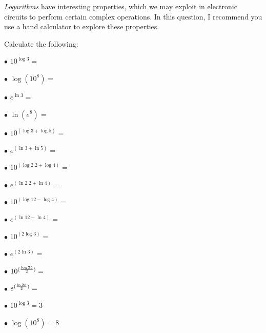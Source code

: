 

{\it Logarithms} have interesting properties, which we may exploit in electronic circuits to perform certain complex operations.  In this question, I recommend you use a hand calculator to explore these properties.

Calculate the following:

\medskip
\item{$\bullet$} $10^{\log 3} =$ 
\item{$\bullet$} $\log (10^8) =$

\vskip 10pt

\item{$\bullet$} $e^{\ln 3} =$ 
\item{$\bullet$} $\ln (e^8) =$

\vskip 10pt

\item{$\bullet$} $10^{(\log 3 + \log 5)} =$
\item{$\bullet$} $e^{(\ln 3 + \ln 5)} =$

\vskip 10pt

\item{$\bullet$} $10^{(\log 2.2 + \log 4)} =$
\item{$\bullet$} $e^{(\ln 2.2 + \ln 4)} =$

\vskip 10pt

\item{$\bullet$} $10^{(\log 12 - \log 4)} =$
\item{$\bullet$} $e^{(\ln 12 - \ln 4)} =$

\vskip 10pt

\item{$\bullet$} $10^{(2 \log 3)} =$
\item{$\bullet$} $e^{(2 \ln 3)} =$

\vskip 10pt

\item{$\bullet$} $10^{({{\log 25} \over 2})} =$
\item{$\bullet$} $e^{({{\ln 25} \over 2})} =$
\medskip







\medskip
\item{$\bullet$} $10^{\log 3} = 3$  
\item{$\bullet$} $\log (10^8) = 8$

